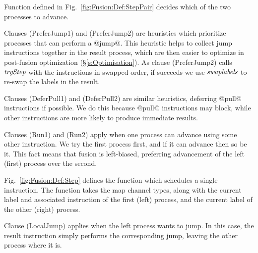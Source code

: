 

Function  defined in Fig.~\ref{fig:Fusion:Def:StepPair} decides which of the two processes to advance.

Clauses (PreferJump1) and (PreferJump2) are heuristics which prioritize processes that can perform a @jump@. This heuristic helps to collect jump instructions together in the result process, which are then easier to optimize in post-fusion optimization (\S\ref{s:Optimisation}). As clause (PreferJump2) calls $\textit{tryStep}$ with the instructions in swapped order, if  succeeds we use $\textit{swaplabels}$ to re-swap the labels in the result.

\eject{}
Clauses (DeferPull1) and (DeferPull2) are similar heuristics, deferring @pull@ instructions if possible. We do this because @pull@ instructions may block, while other instructions are more likely to produce immediate results.

Clauses (Run1) and (Run2) apply when one process can advance using some other instruction. We try the first process first, and if it can advance then so be it. This fact means that fusion is left-biased, preferring advancement of the left (first) process over the second.



\smallskip
Fig.~\ref{fig:Fusion:Def:Step} defines the  function which schedules a single instruction. The  function takes the map channel types, along with the current label and associated instruction of the first (left) process, and the current label of the other (right) process.




Clause (LocalJump) applies when the left process wants to jump.
In this case, the result instruction simply performs the corresponding jump, leaving the other process where it is. 

